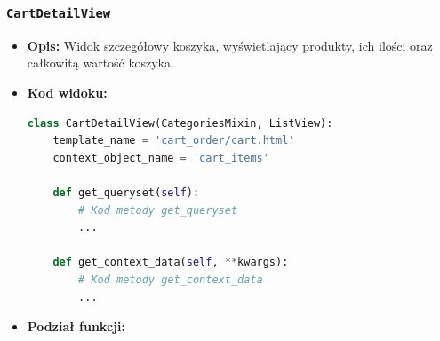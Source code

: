 \documentclass[12pt,a4paper,oneside]{article}
\theoremstyle{definition}
\numberwithin{equation}{section}
\begin{document}
\subsubsection*{\texttt{CartDetailView}}
\begin{itemize}
    \item \textbf{Opis:} Widok szczegółowy koszyka, wyświetlający produkty, ich ilości oraz całkowitą wartość koszyka.
    \item \textbf{Kod widoku:}
\begin{lstlisting}[language=Python, caption=Kod widoku CartDetailView]
class CartDetailView(CategoriesMixin, ListView):
    template_name = 'cart_order/cart.html'
    context_object_name = 'cart_items'

    def get_queryset(self):
        # Kod metody get_queryset
        ...

    def get_context_data(self, **kwargs):
        # Kod metody get_context_data
        ...
\end{lstlisting}

\item \textbf{Podział funkcji:}
\end{itemize}
\end{document}

